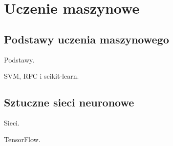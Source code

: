 \chapter{Uczenie maszynowe}\label{ch:uczenie-maszynowe}

\section{Podstawy uczenia maszynowego}\label{sec:podstawy-uczenia-maszynowego}
Podstawy.

SVM, RFC i scikit-learn.

\section{Sztuczne sieci neuronowe}\label{sec:sztuczne-sieci-neuronowe}
Sieci.

TensorFlow.
